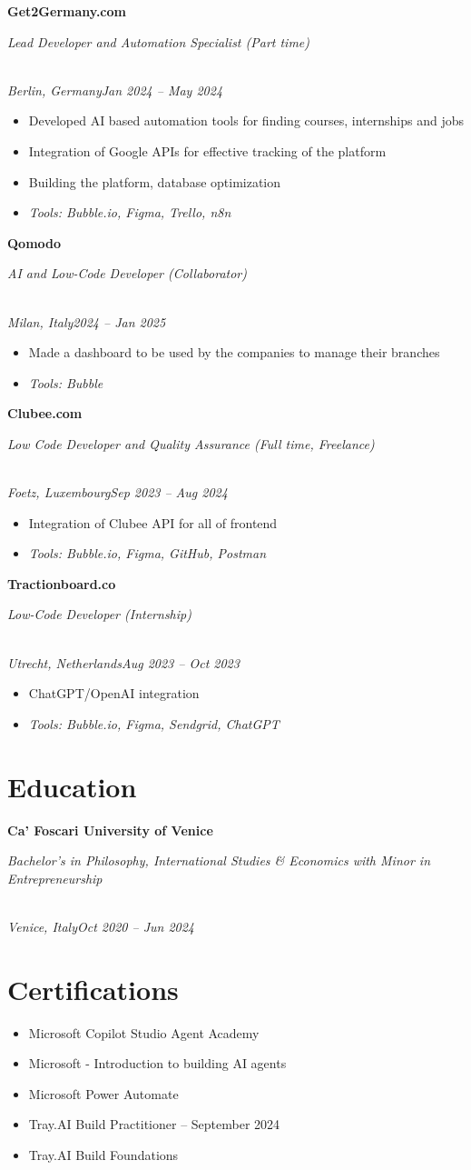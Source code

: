 \documentclass[a4paper,10pt]{article}
\newcommand{\role}[4]{\vspace{3pt}\noindent\hspace{0.6em}\parbox[t]{0.38\textwidth}{\raggedright\textbf{#1}}\hfill\parbox[t]{0.58\textwidth}{\raggedleft\textit{#2}}\\{\textit{#3}\hfill\textit{#4}}\vspace{1pt}}
\begin{document}
\role{Get2Germany.com}{Lead Developer and Automation Specialist (Part time)}{Berlin, Germany}{Jan 2024 -- May 2024}
\begin{itemize}
\item Developed AI based automation tools for finding courses, internships and jobs
\item Integration of Google APIs for effective tracking of the platform
\item Building the platform, database optimization
\item \textit{Tools: Bubble.io, Figma, Trello, n8n}
\end{itemize}

\role{Qomodo}{AI and Low-Code Developer (Collaborator)}{Milan, Italy}{2024 -- Jan 2025}
\begin{itemize}
\item Made a dashboard to be used by the companies to manage their branches
\item \textit{Tools: Bubble}
\end{itemize}

\role{Clubee.com}{Low Code Developer and Quality Assurance (Full time, Freelance)}{Foetz, Luxembourg}{Sep 2023 -- Aug 2024}
\begin{itemize}
\item Integration of Clubee API for all of frontend
\item \textit{Tools: Bubble.io, Figma, GitHub, Postman}
\end{itemize}

\role{Tractionboard.co}{Low-Code Developer (Internship)}{Utrecht, Netherlands}{Aug 2023 -- Oct 2023}
\begin{itemize}
\item ChatGPT/OpenAI integration
\item \textit{Tools: Bubble.io, Figma, Sendgrid, ChatGPT}
\end{itemize}

\section{Education}
\role{Ca' Foscari University of Venice}{Bachelor's in Philosophy, International Studies \& Economics with Minor in Entrepreneurship}{Venice, Italy}{Oct 2020 -- Jun 2024}

\section{Certifications}
\begin{itemize}
\item Microsoft Copilot Studio Agent Academy
\item Microsoft - Introduction to building AI agents
\item Microsoft Power Automate
\item Tray.AI Build Practitioner -- September 2024
\item Tray.AI Build Foundations
\end{itemize}
\end{document}
